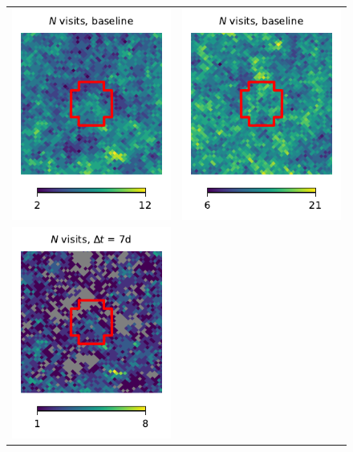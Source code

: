\documentclass[preprintm,linenumbers]{aastex631}
\begin{document}
\begin{figure}
\begin{tabular}{@{}c@{}c@{}}
				\includegraphics{results/skymaps_cutout/skymaps_cutout_first_year_one_snap_v4_0_10yrs_db_noDD_noTwi_nside-256_CountMetric_r_NES_noDD_noTwi.pdf} &
				\includegraphics{results/skymaps_cutout/skymaps_cutout_first_year_one_snap_v4_0_10yrs_db_noDD_noTwi_nside-256_CountMetric_r_WFD_noDD_noTwi.pdf} \\
				\includegraphics{results/skymaps_cutout/skymaps_cutout_first_year_one_snap_v4_0_10yrs_db_noDD_noTwi_tscale-7_nside-256_doAllTemplateMetrics_reduceCount_r_NES_noDD_noTwi.pdf} &

\end{tabular}
\end{figure}
\end{document}
